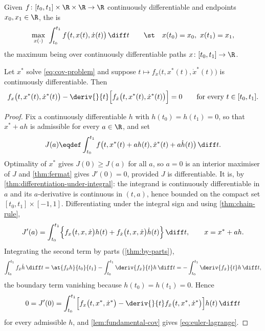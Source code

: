 \begin{definition}\label{def:variational-problem}
	Given $f\colon[t_0,t_1]\times\R\times\R\to\R$ continuously differentiable and
	endpoints $x_0,x_1\in\R$, the  is
	\begin{equation}\label{eq:cov-problem}
		\max_{x(\cdot)}\ \int_{t_0}^{t_1}f\bigl(t,x(t),\dot x(t)\bigr)\,\diff t
		\qquad\st\quad x(t_0)=x_0,\ x(t_1)=x_1,
	\end{equation}
	the maximum being over continuously differentiable paths $x\colon[t_0,t_1]\to\R$.
\end{definition}

\begin{theorem}\label{thm:euler-lagrange}
	Let $x^{\ast}$ solve \eqref{eq:cov-problem} and suppose
	$t\mapsto f_{\dot x}\bigl(t,x^{\ast}(t),\dot x^{\ast}(t)\bigr)$ is continuously
	differentiable. Then
	\begin{equation}\label{eq:euler-lagrange}
		f_x\bigl(t,x^{\ast}(t),\dot x^{\ast}(t)\bigr)
		-\deriv{}{t}\Bigl[f_{\dot x}\bigl(t,x^{\ast}(t),\dot x^{\ast}(t)\bigr)\Bigr]=0
		\qquad\text{for every }t\in[t_0,t_1].
	\end{equation}
\end{theorem}

\begin{proof}
	Fix a continuously differentiable $h$ with $h(t_0)=h(t_1)=0$, so that
	$x^{\ast}+ah$ is admissible for every $a\in\R$, and set
	\[
		J(a)\eqdef\int_{t_0}^{t_1}
		f\bigl(t,x^{\ast}(t)+ah(t),\dot x^{\ast}(t)+a\dot h(t)\bigr)\,\diff t .
	\]
	Optimality of $x^{\ast}$ gives $J(0)\geq J(a)$ for all $a$, so $a=0$ is an
	interior maximiser of $J$ and \autoref{thm:fermat} gives $J'(0)=0$, provided
	$J$ is differentiable. It is, by
	\autoref{thm:differentiation-under-integral}: the integrand is continuously
	differentiable in $a$ and its $a$-derivative is continuous in $(t,a)$, hence
	bounded on the compact set $[t_0,t_1]\times[-1,1]$. Differentiating under the
	integral sign and using \autoref{thm:chain-rule},
	\[
		J'(a)=\int_{t_0}^{t_1}\Bigl\{f_x\bigl(t,x,\dot x\bigr)h(t)
		+f_{\dot x}\bigl(t,x,\dot x\bigr)\dot h(t)\Bigr\}\,\diff t,
		\qquad x=x^{\ast}+ah .
	\]
	Integrating the second term by parts (\autoref{thm:by-parts}),
	\[
		\int_{t_0}^{t_1}f_{\dot x}\dot h\,\diff t
		=\at{f_{\dot x}h}{t_0}{t_1}
		-\int_{t_0}^{t_1}\deriv{f_{\dot x}}{t}h\,\diff t
		=-\int_{t_0}^{t_1}\deriv{f_{\dot x}}{t}h\,\diff t,
	\]
	the boundary term vanishing because $h(t_0)=h(t_1)=0$. Hence
	\[
		0=J'(0)=\int_{t_0}^{t_1}
		\Bigl[f_x\bigl(t,x^{\ast},\dot x^{\ast}\bigr)
			-\deriv{}{t}f_{\dot x}\bigl(t,x^{\ast},\dot x^{\ast}\bigr)\Bigr]h(t)\,\diff t
	\]
	for every admissible $h$, and \autoref{lem:fundamental-cov} gives
	\eqref{eq:euler-lagrange}.
\end{proof}

